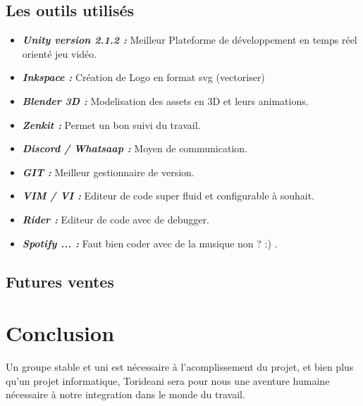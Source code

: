 \documentclass[12pt]{report}
\begin{document}
        \section{Les outils utilisés}
        \begin{itemize}
            \item \textbf{\textit{Unity version 2.1.2 :}} 
             Meilleur Plateforme de développement en temps réel orienté jeu vidéo.  \\
            \item \textbf{\textit{Inkspace :}} Création de Logo en format svg (vectoriser) \\
            \item \textbf{\textit{Blender 3D :}} Modelisation des assets en 3D et leurs animations.\\
            \item \textbf{\textit{Zenkit :}} Permet un bon suivi du travail. \\
            \item \textbf{\textit{Discord / Whatsaap :}} Moyen de communication. \\
            \item \textbf{\textit{GIT  :}} Meilleur gestionnaire de version.\\
            \item \textbf{\textit{VIM / VI :}} Editeur de code super fluid et configurable à souhait.\\
            \item \textbf{\textit{Rider :}} Editeur de code avec de debugger. \\
            \item \textbf{\textit{Spotify ... :}} Faut bien coder avec de la musique non ? :) .
        \end{itemize}
    \section{Futures ventes}


    \chapter{Conclusion}
        Un groupe stable et uni est nécessaire à l'acomplissement du
        projet, et bien plus qu'un projet informatique, Torideani sera pour
        nous une aventure humaine nécessaire à notre integration dans le
        monde du travail.
\end{document}

